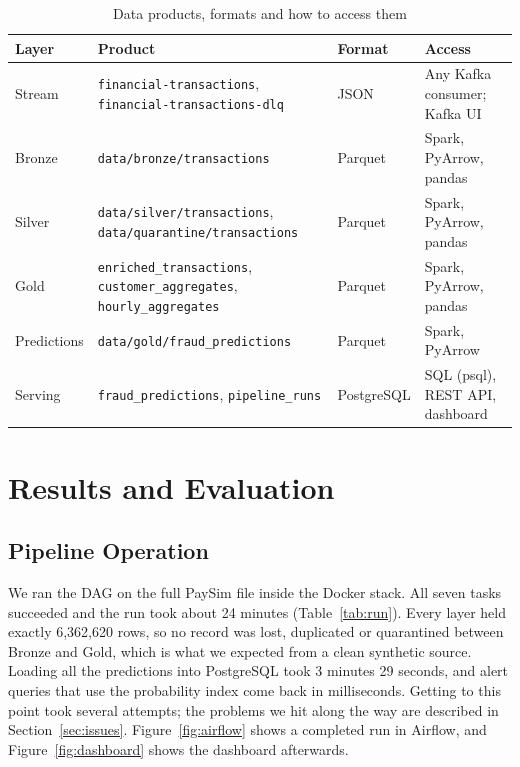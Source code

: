 \documentclass[11pt,a4paper]{article}
\newcommand{\code}[1]{\texttt{#1}}
\begin{document}
\begin{table}[H]
\centering
\caption{Data products, formats and how to access them}
\label{tab:products}
\begin{tabularx}{\linewidth}{lLlL}
\toprule
Layer & Product & Format & Access \\
\midrule
Stream & \code{financial-transactions}, \code{financial-transactions-dlq} & JSON & Any Kafka consumer; Kafka UI \\
Bronze & \code{data/bronze/transactions} & Parquet & Spark, PyArrow, pandas \\
Silver & \code{data/silver/transactions}, \code{data/quarantine/transactions} & Parquet & Spark, PyArrow, pandas \\
Gold & \code{enriched\_transactions}, \code{customer\_aggregates}, \code{hourly\_aggregates} & Parquet & Spark, PyArrow, pandas \\
Predictions & \code{data/gold/fraud\_predictions} & Parquet & Spark, PyArrow \\
Serving & \code{fraud\_predictions}, \code{pipeline\_runs} & PostgreSQL & SQL (psql), REST API, dashboard \\
\bottomrule
\end{tabularx}
\end{table}

\section{Results and Evaluation}

\subsection{Pipeline Operation}
We ran the DAG on the full PaySim file inside the Docker stack. All seven tasks
succeeded and the run took about 24 minutes (Table~\ref{tab:run}). Every layer
held exactly 6,362,620 rows, so no record was lost, duplicated or quarantined
between Bronze and Gold, which is what we expected from a clean synthetic source.
Loading all the predictions into PostgreSQL took 3 minutes 29 seconds, and alert
queries that use the probability index come back in milliseconds. Getting to this
point took several attempts; the problems we hit along the way are described in
Section~\ref{sec:issues}. Figure~\ref{fig:airflow} shows a completed run in
Airflow, and Figure~\ref{fig:dashboard} shows the dashboard afterwards.
\end{document}
